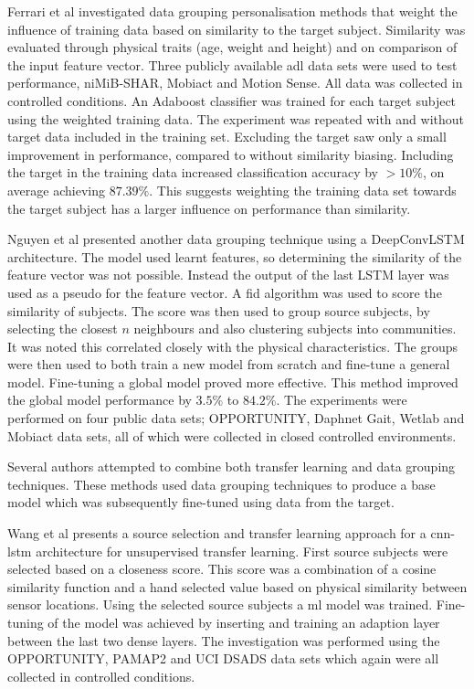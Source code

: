 Ferrari et al investigated data grouping personalisation methods that weight the influence of training data based on similarity to the target subject. Similarity was evaluated through physical traits (age, weight and height) and on comparison of the input feature vector. Three publicly available \acrshort{adl} data sets were used to test performance, niMiB-SHAR\cite{Micucci2017}, Mobiact\cite{Vavoulas2016} and Motion Sense\cite{Katevas2014}. All data was collected in controlled conditions. An Adaboost classifier was trained for each target subject using the weighted training data. The experiment was repeated with and without target data included in the training set. Excluding the target saw only a small improvement in performance, compared to without similarity biasing. Including the target in the training data increased classification accuracy by $>10\%$, on average achieving $87.39\%$. This suggests weighting the training data set towards the target subject has a larger influence on performance than similarity.\cite{Ferrari2020}

Nguyen et al presented another data grouping technique using a DeepConvLSTM architecture. The model used learnt features, so determining the similarity of the feature vector was not possible. Instead the output of the last LSTM layer was used as a pseudo for the feature vector. A \acrfull{fid} algorithm was used to score the similarity of subjects. The score was then used to group source subjects, by selecting the closest $n$ neighbours and also clustering subjects into communities. It was noted this correlated closely with the physical characteristics. The groups were then used to both train a new model from scratch and fine-tune a general model. Fine-tuning a global model proved more effective. This method improved the global model performance by $3.5\%$ to $84.2\%$. The experiments were performed on four public data sets; OPPORTUNITY\cite{Roggen2009}, Daphnet Gait\cite{Sigcha2020}, Wetlab\cite{Scholl2015} and Mobiact\cite{Vavoulas2016} data sets, all of which were collected in closed controlled environments.\cite{Nguyen2021}


Several authors attempted to combine both transfer learning and data grouping techniques. These methods used data grouping techniques to produce a base model which was subsequently fine-tuned using data from the target.

Wang et al presents a source selection and transfer learning approach for a \acrshort{cnn}-\acrshort{lstm} architecture for unsupervised transfer learning. First source subjects were selected based on a closeness score. This score was a combination of a cosine similarity function and a hand selected value based on physical similarity between sensor locations. Using the selected source subjects a \acrshort{ml} model was trained. Fine-tuning of the model was achieved by inserting and training an adaption layer between the last two dense layers. The investigation was performed using the OPPORTUNITY\cite{Roggen2009}, PAMAP2\cite{Reiss2012} and UCI DSADS\cite{Altun2010} data sets which again were all collected in controlled conditions.\cite{Wang2018a}

